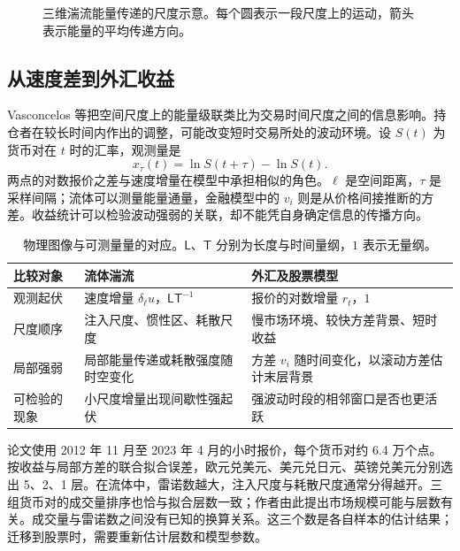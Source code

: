 \documentclass[11pt,a4paper]{article}
\newcommand{\chart}[4]{\begin{figure}[H]\centering\resizebox{#1\linewidth}{!}{}\caption{#3}\label{#4}\end{figure}}
\begin{document}
\chart{.73}{energy_cascade}{三维湍流能量传递的尺度示意。每个圆表示一段尺度上的运动，箭头表示能量的平均传递方向。}{fig:cascade}

\subsection{从速度差到外汇收益}
Vasconcelos 等\cite{vasconcelos2024}把空间尺度上的能量级联类比为交易时间尺度之间的信息影响。持仓者在较长时间内作出的调整，可能改变短时交易所处的波动环境。设 $S(t)$ 为货币对在 $t$ 时的汇率，观测量是
\[
 x_\tau(t)=\ln S(t+\tau)-\ln S(t).
\]
两点的对数报价之差与速度增量在模型中承担相似的角色。$\ell$ 是空间距离，$\tau$ 是采样间隔；流体可以测量能量通量，金融模型中的 $v_i$ 则是从价格间接推断的方差。收益统计可以检验波动强弱的关联，却不能凭自身确定信息的传播方向。
\begin{table}[H]\centering\small
\caption{物理图像与可测量量的对应。$\mathsf L$、$\mathsf T$ 分别为长度与时间量纲，$1$ 表示无量纲。}
\begin{tabular}{L{3.1cm}L{5.2cm}L{6.2cm}}\toprule
比较对象 & 流体湍流 & 外汇及股票模型\\\midrule
观测起伏 & 速度增量 $\delta_\ell u$，$\mathsf L\mathsf T^{-1}$ & 报价的对数增量 $r_t$，$1$\\
尺度顺序 & 注入尺度、惯性区、耗散尺度 & 慢市场环境、较快方差背景、短时收益\\
局部强弱 & 局部能量传递或耗散强度随时空变化 & 方差 $v_i$ 随时间变化，以滚动方差估计末层背景\\
可检验的现象 & 小尺度增量出现间歇性强起伏 & 强波动时段的相邻窗口是否也更活跃\\
\bottomrule\end{tabular}\end{table}
论文使用 2012 年 11 月至 2023 年 4 月的小时报价，每个货币对约 6.4 万个点。按收益与局部方差的联合拟合误差，欧元兑美元、美元兑日元、英镑兑美元分别选出 5、2、1 层。在流体中，雷诺数越大，注入尺度与耗散尺度通常分得越开。三组货币对的成交量排序也恰与拟合层数一致；作者由此提出市场规模可能与层数有关。成交量与雷诺数之间没有已知的换算关系。这三个数是各自样本的估计结果；迁移到股票时，需要重新估计层数和模型参数。

\clearpage
\end{document}
